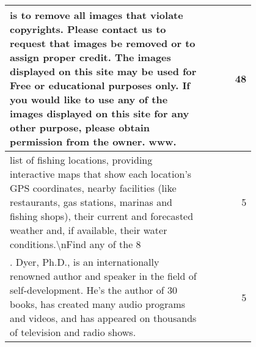 \begin{table*}[h]
\begin{tabular}{p{0.8\linewidth}|r}
    \hline
     is to remove all images that violate copyrights. Please contact us to request that images be removed or to assign proper credit. The images displayed on this site may be used for Free or educational purposes only. If you would like to use any of the images displayed on this site for any other purpose, please obtain permission from the owner. www. &                   48  \\
     \hline
     list of fishing locations, providing interactive maps that show each location's GPS coordinates, nearby facilities (like restaurants, gas stations, marinas and fishing shops), their current and forecasted weather and, if available, their water conditions.\textbackslash{}nFind any of the 8 &                     5  \\
     \hline
    . Dyer, Ph.D., is an internationally renowned author and speaker in the field of self-development. He's the author of 30 books, has created many audio programs and videos, and has appeared on thousands of television and radio shows. &                     5  \\
    \bottomrule
    \end{tabular}%
  \label{tab:exact_substr_examples}%
\end{table*}%





